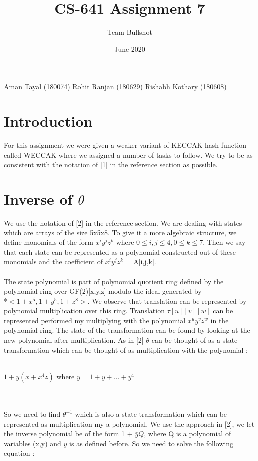 \documentclass[12 pt,a4paper]{article}
\title{CS-641 Assignment 7}
\author{Team Bullshot}
\date{June 2020}
\begin{document}
\maketitle
Aman Tayal (180074)
Rohit Ranjan (180629)
Rishabh Kothary (180608)
\section{Introduction}
For this assignment we were given a weaker variant of KECCAK hash function called WECCAK where we assigned a number of tasks to follow. We try to be as consistent with the notation of [1] in the reference section as possible.
\section{Inverse of $\theta$}
We use the notation of [2] in the reference section. We are dealing with states which are arrays of the size 5x5x8. To give it a more algebraic structure, we define monomials of the form $x^iy^jz^k$ where $0\leq i,j\leq 4, 0\leq k\leq 7$.
Then we say that each state can be represented as a polynomial constructed out of these monomials and the coefficient of $x^iy^jz^k$ = A[i,j,k]. 
\\\\The state polynomial is part of polynomial quotient ring defined by the polynomial ring over GF(2)[x,y,z] modulo the ideal generated by 
\\*$<1 + x^5,1 + y^5,1 + z^8>$. We observe that translation can be represented by polynomial multiplication over this ring. Translation $\tau[u][v][w]$ can be represented performed my multiplying with the polynomial $x^uy^vz^w$ in the polynomial ring.
The state of the transformation can be found by looking at the new polynomial after multiplication.
As in [2] $\theta$ can be thought of as a state transformation which can be thought of as multiplication with the polynomial :\\\\
\centerline{$1 + \bar{y}(x + x^4z)$ where $\bar{y} = 1 + y + ... + y^4$}
\\\\So we need to find $\theta ^{-1}$ which is also a state transformation which can be represented as multiplication my a polynomial. We use the approach in [2],
we let the inverse polynomial be of the form 1 + $\bar{y}Q$, where Q is a polynomial of variables (x,y) and $\bar{y}$ is as defined before. So we need to solve the following equation : \\\\
\end{document}
